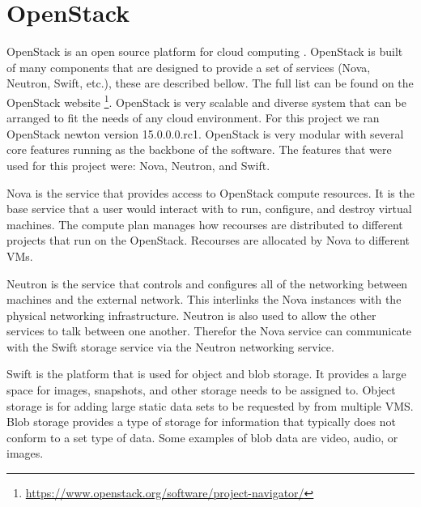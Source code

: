 \documentclass[12pt]{article}
\begin{document}
\section{OpenStack}
OpenStack is an open source platform for cloud computing \cite{OpenStack}. OpenStack is built of many components that are designed to provide a set of services (Nova, Neutron, Swift, etc.), these are described bellow. The full list can be found on the OpenStack website \footnote{ \href{https://www.openstack.org/software/project-navigator/}{https://www.openstack.org/software/project-navigator/}}. OpenStack is very scalable and diverse system that can be arranged to fit the needs of any cloud environment. For this project we ran OpenStack newton version 15.0.0.0.rc1. OpenStack is very modular with several core features running as the backbone of the software. The features that were used for this project were: Nova, Neutron, and Swift.

Nova is the service that provides access to OpenStack compute resources. It is the base service that a user would interact with to run, configure, and destroy virtual machines. The compute plan manages how recourses are distributed to different projects that run on the OpenStack. Recourses are allocated by Nova to different VMs.

Neutron is the service that controls and configures all of the networking between machines and the external network. This interlinks the Nova instances with the physical networking infrastructure. Neutron is also used to allow the other services to talk between one another. Therefor the Nova service can communicate with the Swift storage service via the Neutron networking service.

Swift is the platform that is used for object and blob storage. It provides a large space for images, snapshots, and other storage needs to be assigned to. Object storage is for adding large static data sets to be requested by from multiple VMS. Blob storage provides a type of storage for information that typically does not conform to a set type of data. Some examples of blob data are video, audio, or images.
\end{document}
